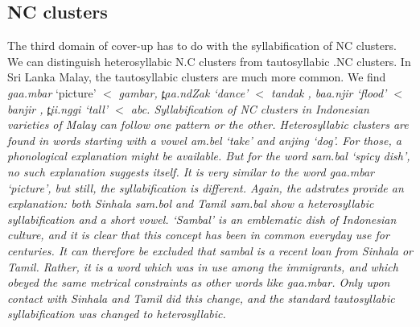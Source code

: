\documentclass[a4paper,10pt]{article}
\newcommand{\trs}[2]{\textit{#1} `#2'}
\newcommand{\dentt}{t̪}
\begin{document}
\subsection{NC clusters} 
The third domain of cover-up has to do with the syllabification of NC clusters. We can distinguish heterosyllabic N.C clusters from tautosyllabic .NC clusters. In Sri Lanka Malay, the tautosyllabic clusters are much more common. We find \trs{gaa.mbar}{picture} 
$<$ \em gambar\em, 
\trs{{\dentt}aa.ndZak}{dance} $<$ \em tandak \em, 
\trs{baa.njir}{flood} $<$ \em banjir \em, 
\trs{{\dentt}ii.nggi}{tall} $<$ \em abc\em. Syllabification of NC clusters in Indonesian varieties of Malay can follow one pattern or the other. Heterosyllabic clusters are found in words starting with a vowel \trs{am.bel}{take} and \trs{anjing}{dog}. For those, a phonological explanation might be available. But for the word \trs{sam.bal}{spicy dish}, no such explanation suggests itself. It is very similar to the word \trs{gaa.mbar}{picture}, but still, the syllabification is different. Again, the
adstrates provide an explanation: both Sinhala \em sam.bol \em and Tamil \em sam.bal \em show a heterosyllabic syllabification and a short vowel. `Sambal' is an emblematic dish of Indonesian culture, and it is clear that this concept has been in common everyday use for centuries. It can therefore be excluded that \em sambal \em is a recent loan from Sinhala or Tamil. Rather, it is a word which was in use among the immigrants, and which obeyed the same metrical constraints as other words like \em gaa.mbar\em. Only upon contact with Sinhala and Tamil did this change, and the standard tautosyllabic syllabification was changed to heterosyllabic.
\end{document}
